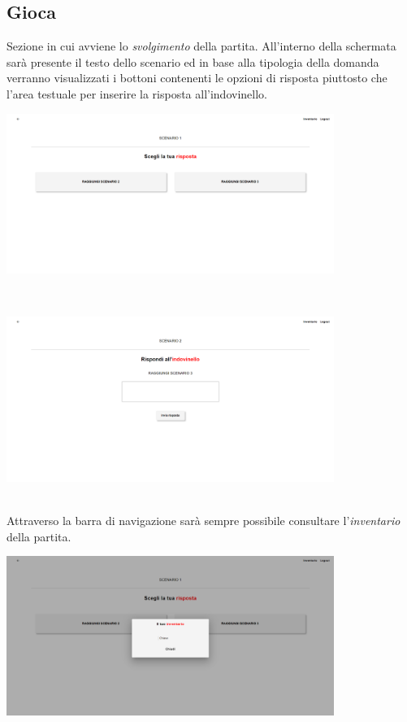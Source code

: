 \documentclass{article}
\begin{document}
\subsection*{Gioca}
Sezione in cui avviene lo \textit{svolgimento} della partita. All'interno della schermata sarà presente il testo dello scenario ed in base alla tipologia della domanda verranno visualizzati i bottoni contenenti le opzioni di risposta piuttosto che l'area testuale per inserire la risposta all'indovinello.
\begin{center}
    \includegraphics[width=0.8\textwidth]{foto23.png}
\end{center}\vspace*{7pt}\\
\begin{center}
    \includegraphics[width=0.8\textwidth]{foto24.png}
\end{center}\vspace*{7pt}\\
Attraverso la barra di navigazione sarà sempre possibile consultare l'\textit{inventario} della partita.
\begin{center}
    \includegraphics[width=0.8\textwidth]{foto25.png}
\end{center}\vspace*{7pt}\\
\end{document}
